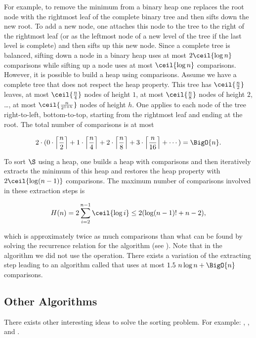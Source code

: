 For example, to remove the minimum from a binary heap one replaces the root
node with the rightmost leaf of the complete binary tree and then sifts down
the new root. To add a new node, one attaches this node to the tree to the
right of the rightmost leaf (or as the leftmost node of a new level
of the tree if the last level is complete) and then sifts up this new node.
Since a complete tree is balanced, sifting down a node in a binary heap uses
at most \(2 \ceil{\log n}\) comparisons while sifting up a node uses at most
\(\ceil{\log n}\)
comparisons. However, it is possible to build a heap using 
comparisons. Assume we have a complete tree that does not respect the heap
property. This tree has \(\ceil{\frac{n}{2}}\) leaves, at most
\(\ceil{\frac{n}{4}}\) nodes of height \(1\), at most \(\ceil{\frac{n}{8}}\)
nodes of height \(2\), \dots, \ie at most \(\ceil{\frac{n}{2^{1+h}}}\) nodes
of height \(h\).
One applies \siftdown to each node of the tree right-to-left,
bottom-to-top, starting from the rightmost leaf and ending at the root. The
total number of comparisons is at most

\begin{displaymath}
2 \cdot ( 0 \cdot \left\lceil\frac{n}{2}\right\rceil + 1 \cdot
\left\lceil\frac{n}{4}\right\rceil + 2 \cdot
\left\lceil\frac{n}{8}\right\rceil + 3 \cdot \left\lceil\frac{n}{16}\right\rceil + \cdots ) = \BigO{n}.
\end{displaymath}

To sort \(\S\) using a heap, one builds a heap with  comparisons and
then iteratively extracts the minimum of this heap and restores the heap
property with \(2\ceil{\log (n-1)}\) comparisons. The maximum number of
comparisons involved in these extraction steps is

\begin{displaymath}
H(n) = 2 \sum_{i=2}^{n-1} \ceil{\log i} \le 2 ( \log (n-1)! + n - 2 ),
\end{displaymath}

which is approximately twice as much comparisons than what can be found by
solving the recurrence relation for the \mergesort algorithm (see
\citet*{OEIS:A001855}). Note that in the \heapsort algorithm we did not use the
\siftup operation. There exists \cite{wegener:1993} a variation of the
extracting step leading to an algorithm called \bottomupheapsort that uses at
most \(1.5~n \log n + \BigO{n}\) comparisons.

\subsection{Other Algorithms}
There exists other interesting ideas to solve the sorting problem. For
example: \shellsort \cite{shell:1959}, \smoothsort \cite{dijkstra:1982},
\introsort \cite{musser:1997} and \timsort \cite{martelli:2006}.

